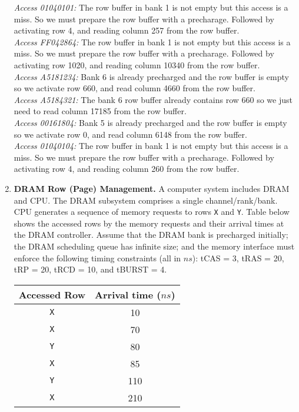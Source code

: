\documentclass[a4paper, 11pt]{exam}
\begin{document}
\begin{enumerate}
{{\textit{Access 01040101:} The row buffer in bank 1 is not empty but this access is a miss. So we must prepare the row buffer with a precharage. Followed by activating row 4, and reading column 257 from the row buffer. \\

\textit{Access FF042864:} The row buffer in bank 1 is not empty but this access is a miss. So we must prepare the row buffer with a precharage. Followed by activating row 1020, and reading column 10340 from the row buffer. \\

\textit{Access A5181234:} Bank 6 is already precharged and the row buffer is empty so we activate row 660, and read column 4660 from the row buffer. \\

\textit{Access A5184321:} The bank 6 row buffer already contains row 660 so we just need to read column 17185 from the row buffer. \\

\textit{Access 00161804:} Bank 5 is already precharged and the row buffer is empty so we activate row 0, and read column 6148 from the row buffer. \\

\textit{Access 01040104:} The row buffer in bank 1 is not empty but this access is a miss. So we must prepare the row buffer with a precharage. Followed by activating row 4, and reading column 260 from the row buffer.
}}

\item \textbf{DRAM Row (Page) Management.}
A computer system includes DRAM and CPU.
The DRAM subsystem comprises a single channel/rank/bank.
CPU generates a sequence of memory requests to rows \texttt{X} and \texttt{Y}.
Table below shows the accessed rows by the memory requests and their arrival times at the DRAM controller.
Assume that the DRAM bank is precharged initially; the DRAM scheduling queue has infinite size; and the memory interface must enforce the following timing constraints (all in $ns$):
tCAS = 3, tRAS = 20, tRP = 20, tRCD = 10, and tBURST = 4. 

\begin{center}
	\begin{tabular}{|c|c|}
		\hline
		\textbf{Accessed Row} & \textbf{Arrival time ($ns$)} \\
		\hline
		\texttt{X}  & 10 \\
		\hline
		\texttt{X}  & 70 \\
		\hline
		\texttt{Y}  & 80 \\
		\hline
		\texttt{X}  & 85 \\
		\hline
		\texttt{Y}  & 110 \\
		\hline
		\texttt{X} & 210 \\
		\hline
	\end{tabular}
\end{center}


\end{enumerate}
\end{document}
